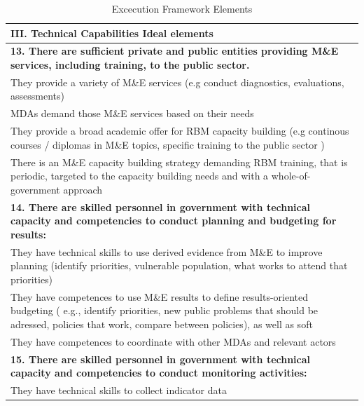 \documentclass[
  10pt,
]{book}
\begin{document}
\begin{table}

\caption{\label{tab:unnamed-chunk-2}Excecution Framework Elements}
\centering
\begin{tabular}[t]{l}
\hline
III. Technical Capabilities Ideal elements\\
\hline
\multicolumn{1}{l}{\textbf{13. There are sufficient private and public entities providing M\&E services, including training, to the public sector.}}\\
\hline
\hspace{1em}They provide a variety of M\&E services (e.g conduct diagnostics, evaluations, assessments)\\
\hline
\hspace{1em}MDAs demand those M\&E services based on their needs\\
\hline
\hspace{1em}They provide a broad academic offer for RBM capacity building (e.g continous courses / diplomas in M\&E topics, specific training to the public sector )\\
\hline
\hspace{1em}There is an M\&E capacity building strategy demanding RBM training, that is periodic, targeted to the capacity building needs and with a whole-of-government approach\\
\hline
\multicolumn{1}{l}{\textbf{14. There are skilled personnel in government with technical capacity and competencies to conduct planning and budgeting for results:}}\\
\hline
\hspace{1em}They have technical skills to use derived evidence from M\&E to improve planning (identify priorities, vulnerable population, what works to attend that priorities)\\
\hline
\hspace{1em}They have competences to use M\&E results to define results-oriented budgeting ( e.g., identify priorities, new public problems that should be adressed, policies that work, compare between policies), as well as soft\\
\hline
\hspace{1em}They have competences to coordinate with other MDAs and relevant actors\\
\hline
\multicolumn{1}{l}{\textbf{15. There are skilled personnel in government with technical capacity and competencies to conduct monitoring activities:}}\\
\hline
\hspace{1em}They have technical skills to collect indicator data\\

\end{tabular}
\end{table}
\end{document}
